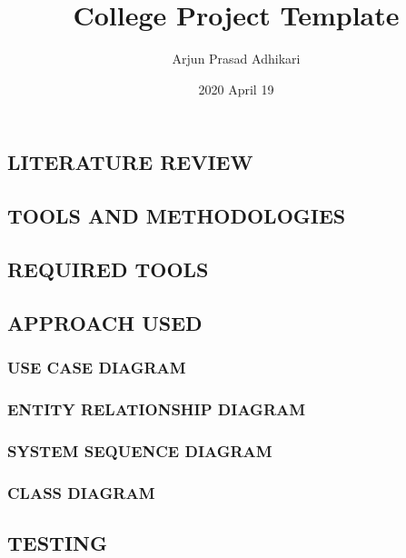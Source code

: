 \documentclass[a4paper, 14pt]{report}
\title{College Project Template}
\author{Arjun Prasad Adhikari}
\date{2020 April 19}
\begin{document}
	
	
\begin{description}


		
		
		
		
		
		\tableofcontents
		\listoffigures
		\listoftables
		
		
		
	
		
	
	\begin{center}
		\chapter{LITERATURE REVIEW}
	\end{center}
	
	\begin{center}
		\chapter{TOOLS AND METHODOLOGIES}
	\end{center}
	
	\section{REQUIRED TOOLS}
	\section{APPROACH USED}
	\subsection{USE CASE DIAGRAM}
	\subsection{ENTITY RELATIONSHIP DIAGRAM}
	\subsection{SYSTEM SEQUENCE DIAGRAM}
	\subsection{CLASS DIAGRAM}
	
	\begin{center}
		\chapter{TESTING}
	\end{center}

\end{description}
\end{document}
